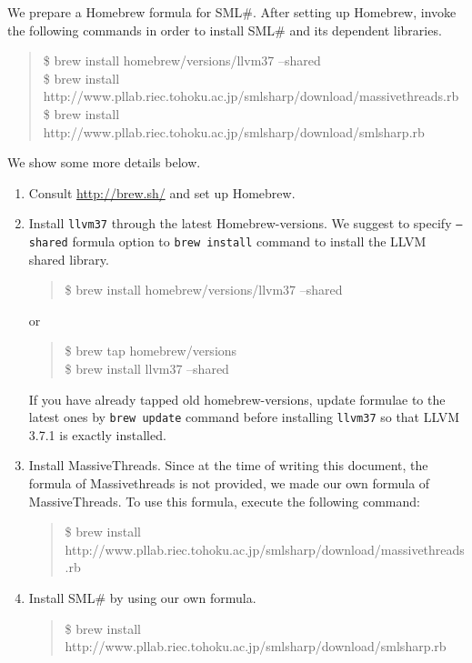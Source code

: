 \documentclass{jbook}
\newcommand{\smlsharp}{SML\#}
\newenvironment{program}{\begin{quote}\begin{tt}}%
                        {\end{tt}\end{quote}}
\begin{document}
\else%

	We prepare a Homebrew formula for \smlsharp{}.
	After setting up Homebrew, invoke the following commands in order to
install \smlsharp{} and its dependent libraries.
\begin{program}
\$ brew install homebrew/versions/llvm37 --shared\\
\$ brew install http://www.pllab.riec.tohoku.ac.jp/smlsharp/download/massivethreads.rb\\
\$ brew install http://www.pllab.riec.tohoku.ac.jp/smlsharp/download/smlsharp.rb
\end{program}

	We show some more details below.
\begin{enumerate}
\item 
	Consult \url{http://brew.sh/} and set up Homebrew.

\item
	Install {\tt llvm37} through the latest Homebrew-versions.
	We suggest to specify {\tt --shared} formula option to
{\tt brew install} command to install the LLVM shared library.
\begin{program}
\$ brew install homebrew/versions/llvm37 --shared
\end{program}
or
\begin{program}
\$ brew tap homebrew/versions\\
\$ brew install llvm37 --shared
\end{program}
	If you have already tapped old homebrew-versions,
update formulae to the latest ones by {\tt brew update} command before
installing {\tt llvm37} so that LLVM 3.7.1 is exactly installed.

\item
	Install MassiveThreads.
	Since at the time of writing this document, the formula of
Massivethreads is not provided,
we made our own formula of MassiveThreads.
	To use this formula, execute the following command:
\begin{program}
\$ brew install http://www.pllab.riec.tohoku.ac.jp/smlsharp/download/massivethreads.rb
\end{program}

\item
	Install \smlsharp{} by using our own formula.
\begin{program}
\$ brew install http://www.pllab.riec.tohoku.ac.jp/smlsharp/download/smlsharp.rb
\end{program}
\end{enumerate}
\end{document}
